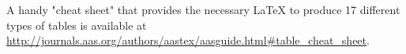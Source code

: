 \documentclass[preprint2]{aastex63}
\begin{document}

A handy "cheat sheet" that provides the necessary LaTeX to produce 17 
different types of tables is available at \url{http://journals.aas.org/authors/aastex/aasguide.html#table_cheat_sheet}.
\end{document}
